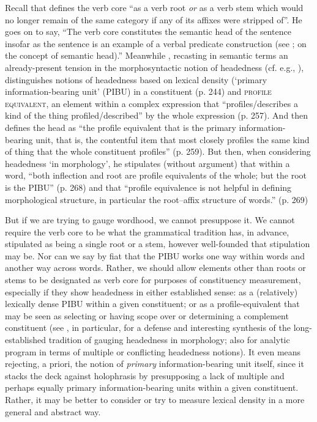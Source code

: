 \documentclass[output=paper]{langscibook}
\begin{document}
Recall that \citet[13]{Tallman2021} defines the verb core ``as a verb root \textit{or} as a verb stem which would no longer remain of the same category if any of its affixes were stripped of''. He goes on to say, ``The verb core constitutes the semantic head of the sentence insofar as the sentence is an example of a verbal predicate construction (see \citealt[259]{Croft2001}; \citealt[2\ref{mood}--27]{Anderson2006} on the concept of semantic head).'' Meanwhile \citet{Croft2001}, recasting in semantic terms an already-present tension in the morphosyntactic notion of headedness (cf. e.g., \citealt{Zwicky1985}), distinguishes notions of headedness based on lexical density (`primary information-bearing unit' (PIBU) in a constituent (p. 244) and \textsc{profile} \textsc{equivalent}, an element within a complex expression that ``profiles{\slash}describes a kind of the thing profiled/described'' by the whole expression (p. 257). And \citet{Croft2001} then defines the head as ``the profile equivalent that is the primary information-bearing unit, that is, the contentful item that most closely profiles the same kind of thing that the whole constituent profiles'' (p. 259). But then, when considering headedness `in morphology', he stipulates (without argument) that within a word, ``both inflection and root are profile equivalents of the whole; but the root is the PIBU'' (p. 268) and that ``profile equivalence is not helpful in defining morphological structure, in particular the root–affix structure of words.'' (p. 269)

But if we are trying to gauge wordhood, we cannot presuppose it. We cannot require the verb core to be what the grammatical tradition has, in advance, stipulated as being a single root or a stem, however well-founded that stipulation may be. Nor can we say by fiat that the PIBU works one way within words and another way across words. Rather, we should allow elements other than roots or stems to be designated as verb core for purposes of constituency measurement, especially if they show headedness in either established sense: as a (relatively) lexically dense PIBU within a given constituent; or as a profile-equivalent that may be seen as selecting or having scope over or determining a complement constituent (see \citealt{Haspelmath1992}, in particular, for a defense and interesting synthesis of the long-established tradition of gauging headedness in morphology; also \citealt{Woodbury1981} for analytic program in terms of multiple or conflicting headedness notions). It even means rejecting, a priori, the notion of \textit{primary} information-bearing unit itself, since it stacks the deck against holophrasis by presupposing a lack of multiple and perhaps equally primary information-bearing units within a given constituent. Rather, it may be better to consider or try to measure lexical density in a more general and abstract way.
\end{document}

